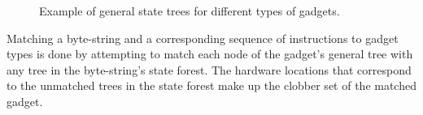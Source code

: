     \begin{figure}
        \centering
        \caption{Example of general state trees for different types of gadgets.}
        \label{fig:method-general-trees}
    \end{figure}

    Matching a byte-string and a corresponding sequence of instructions to
    gadget types is done by attempting to match each node of the gadget's
    general tree with any tree in the byte-string's state forest. The hardware
    locations that correspond to the unmatched trees in the state forest make up
    the clobber set of the matched gadget.

